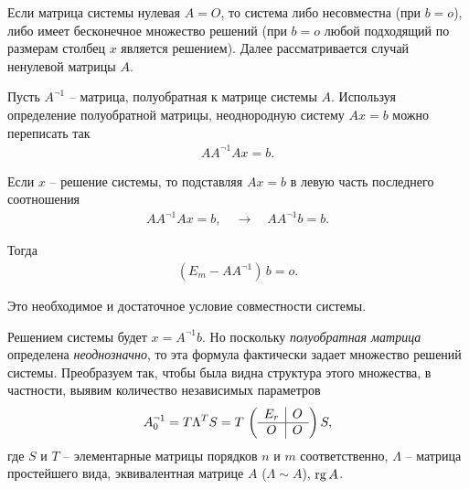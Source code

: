 \documentclass[%
	11pt,
	a4paper,
	utf8,
		]{article}
\begin{document}
Если матрица системы нулевая $ A = O $, то система либо несовместна (при $ b = o $), либо имеет бесконечное множество решений (при $ b = o $ любой подходящий по размерам столбец $ x $ является решением). Далее рассматривается случай ненулевой матрицы $ A $.

Пусть $ A^{\neg 1} $ -- матрица, полуобратная к матрице системы $ A $. Используя определение полуобратной матрицы, неоднородную систему $ Ax = b $ можно переписать так
\begin{align*}
	A A^{\neg 1} A x = b.
\end{align*}

Если $ x $ -- решение системы, то подставляя $ A x = b $ в левую часть последнего соотношения
\begin{align*}
	A A^{\neg 1} A x = b, \quad \rightarrow \quad A A^{\neg 1} b = b.
\end{align*}

Тогда
\begin{align*}
  (E_m - A A^{\neg 1}) \, b = o.
\end{align*}

Это необходимое и достаточное условие совместности системы.

Решением системы будет $ x = A^{\neg 1} b $. Но поскольку \emph{полуобратная матрица} определена \emph{неоднозначно}, то эта формула фактически задает множество решений системы. Преобразуем так, чтобы была видна структура этого множества, в частности, выявим количество независимых параметров
\begin{align*}
  A^{\neg 1}_0 = T \Lambda^T S = T \,
    \begin{pmatrix}
          \begin{array}{c | c}
          	E_r & O \\
          	\hline
          	O & O
          \end{array}
    \end{pmatrix}
    S,
\end{align*}
где $ S $ и $ T $ -- элементарные матрицы порядков $ n $ и $ m $ соответственно, $ \Lambda $ -- матрица простейшего вида, эквивалентная матрице $ A $ ($ \Lambda \sim A $), $ \operatorname*{rg} A $.
\end{document}

